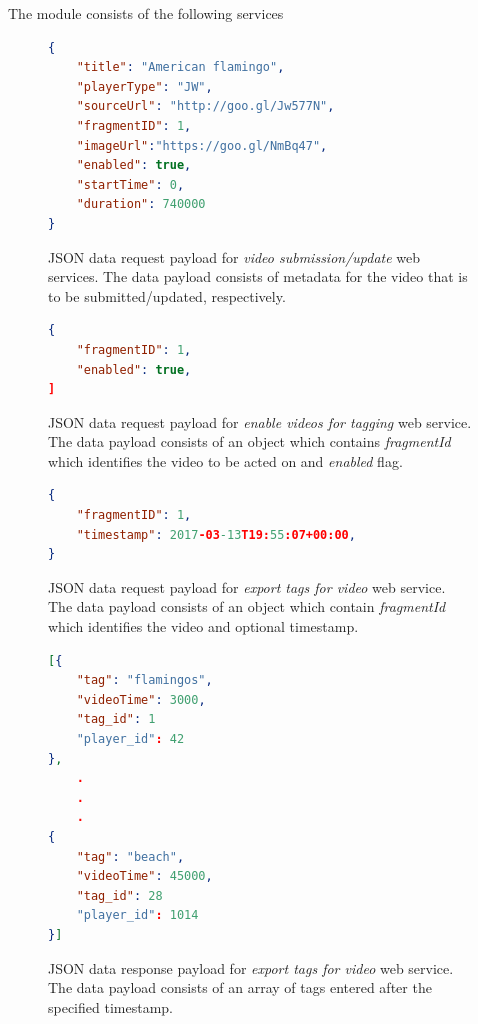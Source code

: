 The module consists of the following services

\begin{figure}
\centering
\begin{lstlisting}[language=json,firstnumber=1]
{
	"title": "American flamingo",
	"playerType": "JW",
	"sourceUrl": "http://goo.gl/Jw577N",
	"fragmentID": 1,
	"imageUrl":"https://goo.gl/NmBq47",
	"enabled": true,
	"startTime": 0,
	"duration": 740000
}
\end{lstlisting}
\caption{JSON data request payload for \textit{video submission/update} web services. The data payload consists of metadata for the video that is to be submitted/updated, respectively.}
\label{chap:waisda:add-update-json}
\end{figure}


\begin{figure}
\centering
\begin{lstlisting}[language=json,firstnumber=1]
{
	"fragmentID": 1,
	"enabled": true,
]
\end{lstlisting}
\caption{JSON data request payload for \textit{enable videos for tagging} web service. The data payload consists of an object which contains \textit{fragmentId} which identifies the video to be acted on and \textit{enabled} flag.}
\label{chap:waisda:enable-json}
\end{figure}

\begin{figure}
\centering
\begin{lstlisting}[language=json,firstnumber=1]
{
	"fragmentID": 1,
	"timestamp": 2017-03-13T19:55:07+00:00,
}
\end{lstlisting}
\caption{JSON data request payload for \textit{export tags for video} web service. The data payload consists of an object which contain \textit{fragmentId} which identifies the video and optional timestamp.}
\label{chap:waisda:export-json}
\end{figure}

\begin{figure}
\centering
\begin{lstlisting}[language=json,firstnumber=1]
[{
	"tag": "flamingos",
	"videoTime": 3000,
	"tag_id": 1
	"player_id": 42
},
	.
	.
	.
{
	"tag": "beach",
	"videoTime": 45000,
	"tag_id": 28
	"player_id": 1014
}]
\end{lstlisting}
\caption{JSON data response payload for \textit{export tags for video} web service. The data payload consists of an array of tags entered after the specified timestamp.}
\label{chap:waisda:export-json-result}
\end{figure}

